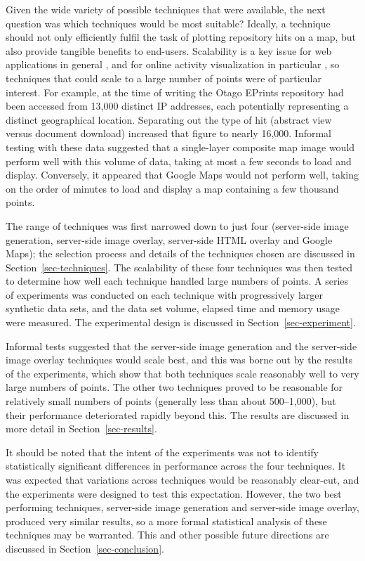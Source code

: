 \documentclass[acmnow]{acmtrans2m}
\begin{document}
Given the wide variety of possible techniques that were available, the
next question was which techniques would be most suitable? Ideally, a
technique should not only efficiently fulfil the task of plotting
repository hits on a map, but also provide tangible benefits to
end-users. Scalability is a key issue for web applications in general
\cite[p.\ 28]{Offu-J-2002-quality}, and for online activity
visualization in particular \cite[p.\ 50]{Eick-SG-2001-sitevis}, so
techniques that could scale to a large number of points were of
particular interest. For example, at the time of writing the Otago
EPrints repository had been accessed from 13,000 distinct IP addresses,
each potentially representing a distinct geographical location.
Separating out the type of hit (abstract view versus document download)
increased that figure to nearly 16,000. Informal testing with these data
suggested that a single-layer composite map image would perform well
with this volume of data, taking at most a few seconds to load and
display. Conversely, it appeared that Google Maps would not perform
well, taking on the order of minutes to load and display a map
containing a few thousand points.

The range of techniques was first narrowed down to just four
(server-side image generation, server-side image overlay, server-side
HTML overlay and Google Maps); the selection process and details of the
techniques chosen are discussed in Section~\ref{sec-techniques}. The
scalability of these four techniques was then tested to determine how
well each technique handled large numbers of points. A series of
experiments was conducted on each technique with progressively larger
synthetic data sets, and the data set volume, elapsed time and memory
usage were measured. The experimental design is discussed in
Section~\ref{sec-experiment}.

Informal tests suggested that the server-side image generation and the
server-side image overlay techniques would scale best, and this was
borne out by the results of the experiments, which show that both
techniques scale reasonably well to very large numbers of points. The
other two techniques proved to be reasonable for relatively small
numbers of points (generally less than about 500--1,000), but their
performance deteriorated rapidly beyond this. The results are discussed
in more detail in Section~\ref{sec-results}.

It should be noted that the intent of the experiments was not to
identify statistically significant differences in performance across the
four techniques. It was expected that variations across techniques would
be reasonably clear-cut, and the experiments were designed to test this
expectation. However, the two best performing techniques, server-side
image generation and server-side image overlay, produced very similar
results, so a more formal statistical analysis of these techniques may
be warranted. This and other possible future directions are discussed in
Section~\ref{sec-conclusion}.
\end{document}

